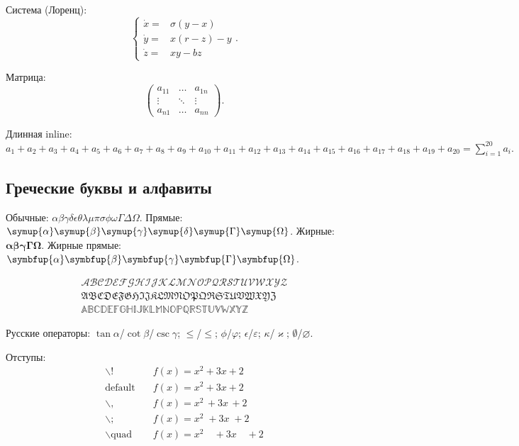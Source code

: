 \documentclass[font=modern]{cmcmsuthesis-bachelor}
\begin{document}
Система (Лоренц):
\[\left\{\begin{array}{rl}\dot x=&\sigma(y-x)\\\dot y=&x(r-z)-y\\\dot z=&xy-bz\end{array}\right..\]

Матрица:
\[\left(\begin{array}{ccc}a_{11}&\ldots&a_{1n}\\\vdots&\ddots&\vdots\\a_{n1}&\ldots&a_{nn}\end{array}\right).\]

Длинная inline: $a_1+a_2+a_3+a_4+a_5+a_6+a_7+a_8+a_9+a_{10}+a_{11}+a_{12}+a_{13}+a_{14}+a_{15}+a_{16}+a_{17}+a_{18}+a_{19}+a_{20}=\sum_{i=1}^{20}a_i.$

\subsection{Греческие буквы и алфавиты}
Обычные: $\alpha\beta\gamma\delta\epsilon\theta\lambda\mu\pi\sigma\phi\omega\Gamma\Delta\Omega$.
Прямые: $\symup{\alpha}\symup{\beta}\symup{\gamma}\symup{\delta}\symup{\Gamma}\symup{\Omega}$.
Жирные: $\symbf{\alpha}\symbf{\beta}\symbf{\gamma}\symbf{\Gamma}\symbf{\Omega}$.
Жирные прямые: $\symbfup{\alpha}\symbfup{\beta}\symbfup{\gamma}\symbfup{\Gamma}\symbfup{\Omega}$.

\[\begin{aligned}\mathcal{ABCDEFGHIJKLMNOPQRSTUVWXYZ}\\\mathfrak{ABCDEFGHIJKLMNOPQRSTUVWXYZ}\\\mathbb{ABCDEFGHIJKLMNOPQRSTUVWXYZ}\end{aligned}\]

Русские операторы: $\tan\alpha$/$\cot\beta$/$\csc\gamma$; $\le$/$\leqslant$; $\phi$/$\varphi$; $\epsilon$/$\varepsilon$; $\kappa$/$\varkappa$; $\emptyset$/$\varnothing$.

Отступы:
\[\begin{aligned}\backslash!&\quad f(x)=x^2\!+3x\!+2\\\text{default}&\quad f(x)=x^2+3x+2\\\backslash,&\quad f(x)=x^2\,+3x\,+2\\\backslash;&\quad f(x)=x^2\;+3x\;+2\\\backslash\text{quad}&\quad f(x)=x^2\quad+3x\quad+2\end{aligned}\]

\end{document}
